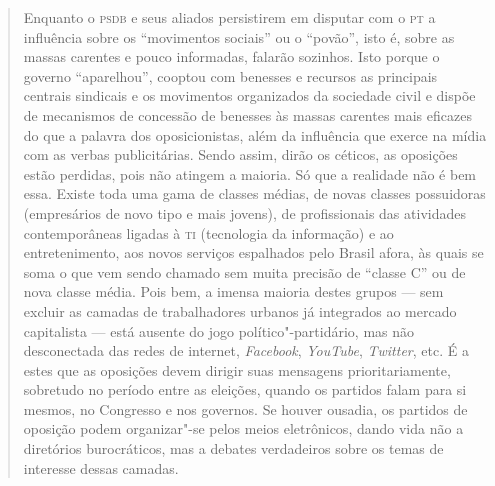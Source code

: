 \begin{quote}
Enquanto o \textsc{psdb} e seus aliados persistirem em disputar com o \textsc{pt} a
influência sobre os ``movimentos sociais'' ou o ``povão'', isto é, sobre
as massas carentes e pouco informadas, falarão sozinhos. Isto porque o
governo ``aparelhou'', cooptou com benesses e recursos as principais
centrais sindicais e os movimentos organizados da sociedade civil e
dispõe de mecanismos de concessão de benesses às massas carentes mais
eficazes do que a palavra dos oposicionistas, além da influência que
exerce na mídia com as verbas publicitárias. Sendo assim, dirão os
céticos, as oposições estão perdidas, pois não atingem a maioria. Só que
a realidade não é bem essa. Existe toda uma gama de classes médias, de
novas classes possuidoras (empresários de novo tipo e mais jovens), de
profissionais das atividades contemporâneas ligadas à \textsc{ti} (tecnologia da
informação) e ao entretenimento, aos novos serviços espalhados pelo
Brasil afora, às quais se soma o que vem sendo chamado sem muita
precisão de ``classe C'' ou de nova classe média. Pois bem, a imensa
maioria destes grupos --- sem excluir as camadas de trabalhadores urbanos
já integrados ao mercado capitalista --- está ausente do jogo
político"-partidário, mas não desconectada das redes de internet,
\emph{Facebook}, \emph{YouTube}, \emph{Twitter}, etc. É a estes que as
oposições devem dirigir suas mensagens prioritariamente, sobretudo no
período entre as eleições, quando os partidos falam para si mesmos, no
Congresso e nos governos. Se houver ousadia, os partidos de oposição
podem organizar"-se pelos meios eletrônicos, dando vida não a diretórios
burocráticos, mas a debates verdadeiros sobre os temas de interesse
dessas camadas.


\end{quote}
